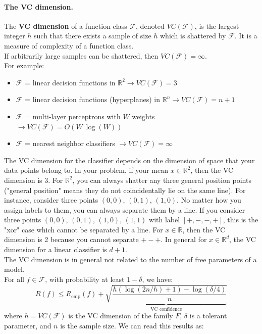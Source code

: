 \paragraph*{The VC dimension.} The \textbf{VC dimension} of a function class $\mathcal{ F }$, denoted $VC(\mathcal{ F })$, is the largest integer $h$ such that there exists a sample of size $h$ which is shattered by $\mathcal{ F }$. It is a measure of complexity of a function class.\\
If arbitrarily large samples can be shattered, then $VC(\mathcal{ F }) = \infty$.\\
For example:
\begin{itemize}
	\item $\mathcal{ F }$ = linear decision functions in $\mathbb{R}^2 \rightarrow VC(\mathcal{ F }) = 3$
	\item $\mathcal{ F }$ = linear decision functions (hyperplanes) in $\mathbb{R}^n \rightarrow VC(\mathcal{ F }) = n+1$ 
	\item $\mathcal{ F }$ = multi-layer perceptrons with $W$ weights $\rightarrow VC(\mathcal{ F }) = O(W~\log( W))$
	\item $\mathcal{ F }$ = nearest neighbor classifiers $\rightarrow VC(\mathcal{ F }) = \infty$
\end{itemize}


The VC dimension for the classifier depends on the dimension of space that your data points belong to. In your problem, if your mean $x\in \mathbb{R}^2$, then the VC dimension is $3$. For $\mathbb{R}^2$, you can always shatter any three general position points ("general position" means they do not coincidentally lie on the same line). For instance, consider three points $(0,0)$, $(0,1)$, $(1,0)$. No matter how you assign labels to them, you can always separate them by a line. If you consider three points $(0,0)$, $(0,1)$, $(1,0)$, $(1,1)$ with label $[+,-,-,+]$, this is the "xor" case which cannot be separated by a line. For $x\in\mathbb{R}$, then the VC dimension is 2 because you cannot separate $+-+$. In general for $x\in\mathbb{R}^d$, the VC dimension for a linear classifier is $d+1$.\\

The VC dimension is in general not related to the number of free parameters of a model.\\
For all $f \in \mathcal{ F }$, with probability at least $1-\delta$, we have:
$$
R ( f ) \leq R _ { \mathrm { emp } } ( f ) + \underbrace{\sqrt { \frac { h ( \log ( 2 n / h ) + 1 ) - \log ( \delta / 4 ) } { n } }}_{\text{VC confidence}}
$$
where $h=VC(\mathcal{ F })$ is the VC dimension of the family $F$, $\delta$ is a tolerant parameter, and $n$ is the sample size. We can read this results as:\\

